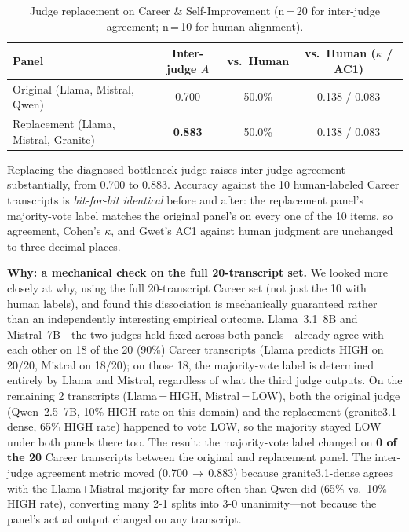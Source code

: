 \documentclass[11pt]{article}
\begin{document}
\begin{table}[ht]
\centering
\caption{Judge replacement on Career \& Self-Improvement (n\,=\,20 for
inter-judge agreement; n\,=\,10 for human alignment).}
\label{tab:judgereplacement}
\footnotesize
\begin{tabular}{lccc}
\toprule
\textbf{Panel} & \textbf{Inter-judge $A$} & \textbf{vs.\ Human} & \textbf{vs.\ Human ($\kappa$ / AC1)} \\
\midrule
Original (Llama, Mistral, Qwen)     & 0.700 & 50.0\% & 0.138 / 0.083 \\
Replacement (Llama, Mistral, Granite) & \textbf{0.883} & 50.0\% & 0.138 / 0.083 \\
\bottomrule
\end{tabular}
\end{table}

Replacing the diagnosed-bottleneck judge raises inter-judge agreement
substantially, from 0.700 to 0.883. Accuracy against the 10 human-labeled
Career transcripts is \emph{bit-for-bit identical} before and after: the
replacement panel's majority-vote label matches the original panel's on
every one of the 10 items, so agreement, Cohen's $\kappa$, and Gwet's AC1
against human judgment are unchanged to three decimal places.

\textbf{Why: a mechanical check on the full 20-transcript set.} We looked
more closely at why, using the full 20-transcript Career set (not just the
10 with human labels), and found this dissociation is mechanically
guaranteed rather than an independently interesting empirical outcome.
Llama~3.1~8B and Mistral~7B---the two judges held fixed across both
panels---already agree with each other on 18 of the 20 (90\%) Career
transcripts (Llama predicts HIGH on 20/20, Mistral on 18/20); on those 18,
the majority-vote label is determined entirely by Llama and Mistral,
regardless of what the third judge outputs. On the remaining 2
transcripts (Llama\,=\,HIGH, Mistral\,=\,LOW), both the original judge
(Qwen~2.5~7B, 10\% HIGH rate on this domain) and the replacement
(granite3.1-dense, 65\% HIGH rate) happened to vote LOW, so the majority
stayed LOW under both panels there too. The result: the majority-vote
label changed on \textbf{0 of the 20} Career transcripts between the
original and replacement panel. The inter-judge agreement metric moved
(0.700\,$\to$\,0.883) because granite3.1-dense agrees with the
Llama+Mistral majority far more often than Qwen did (65\% vs.\ 10\% HIGH
rate), converting many 2-1 splits into 3-0 unanimity---not because the
panel's actual output changed on any transcript.
\end{document}
